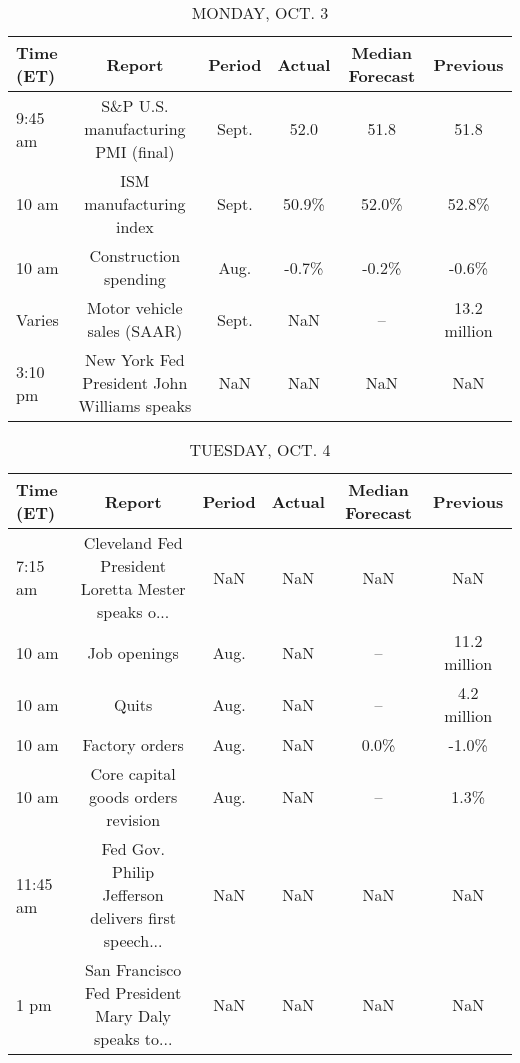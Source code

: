 \documentclass{article}%
\begin{document}
%
\normalsize%


\begin{table}[htbp]%
\caption{MONDAY, OCT. 3}%
\centering%
\begin{adjustbox}{width=1\textwidth}%
\begin{tabular}{lccccc}
\toprule
Time (ET) &                                      Report & Period & Actual & Median Forecast &     Previous \\
\midrule
  9:45 am &          S\&P U.S. manufacturing PMI (final) &  Sept. &   52.0 &            51.8 &         51.8 \\
    10 am &                     ISM manufacturing index &  Sept. &  50.9\% &           52.0\% &        52.8\% \\
    10 am &                       Construction spending &   Aug. &  -0.7\% &           -0.2\% &        -0.6\% \\
   Varies &                  Motor vehicle sales (SAAR) &  Sept. &    NaN &              -- & 13.2 million \\
  3:10 pm & New York Fed President John Williams speaks &    NaN &    NaN &             NaN &          NaN \\
\bottomrule
\end{tabular}
%
\end{adjustbox}%
\end{table}

%


\begin{table}[htbp]%
\caption{TUESDAY, OCT. 4}%
\centering%
\begin{adjustbox}{width=1\textwidth}%
\begin{tabular}{lccccc}
\toprule
Time (ET) &                                             Report & Period & Actual & Median Forecast &     Previous \\
\midrule
  7:15 am & Cleveland Fed President Loretta Mester speaks o... &    NaN &    NaN &             NaN &          NaN \\
    10 am &                                       Job openings &   Aug. &    NaN &              -- & 11.2 million \\
    10 am &                                              Quits &   Aug. &    NaN &              -- &  4.2 million \\
    10 am &                                     Factory orders &   Aug. &    NaN &            0.0\% &        -1.0\% \\
    10 am &                 Core capital goods orders revision &   Aug. &    NaN &              -- &         1.3\% \\
 11:45 am & Fed Gov. Philip Jefferson delivers first speech... &    NaN &    NaN &             NaN &          NaN \\
     1 pm & San Francisco Fed President Mary Daly speaks to... &    NaN &    NaN &             NaN &          NaN \\
\bottomrule
\end{tabular}
%
\end{adjustbox}%
\end{table}
\end{document}
